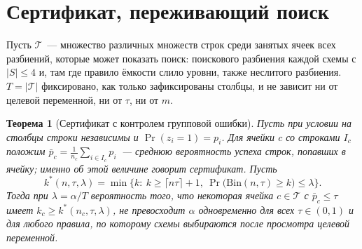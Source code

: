 \documentclass[11pt]{article}
\newtheorem{theorem}{Теорема}
\begin{document}
\section{Сертификат, переживающий поиск}\label{sec:certificate}

Пусть $\mathcal{T}$~--- множество различных множеств строк среди занятых ячеек всех разбиений, которые может показать поиск: поискового разбиения каждой схемы с $|S|\le 4$ и, там где правило ёмкости слило уровни, также неслитого разбиения. $T=|\mathcal{T}|$ фиксировано, как только зафиксированы столбцы, и не зависит ни от целевой переменной, ни от $\tau$, ни от $m$.

\begin{theorem}[Сертификат с контролем групповой ошибки]\label{thm:cert}
Пусть при условии на столбцы строки независимы и $\Pr(z_i=1)=p_i$. Для ячейки $c$ со строками $I_c$ положим $\bar p_c=\frac1{n_c}\sum_{i\in I_c}p_i$~--- среднюю вероятность успеха строк, попавших в ячейку; именно об этой величине говорит сертификат. Пусть
\[
k^*(n,\tau,\lambda)=\min\Big\{k:\ k\ge\lceil n\tau\rceil+1,\ \Pr\big(\mathrm{Bin}(n,\tau)\ge k\big)\le\lambda\Big\}.
\]
Тогда при $\lambda=\alpha/T$ вероятность того, что некоторая ячейка $c\in\mathcal{T}$ с $\bar p_c\le\tau$ имеет $k_c\ge k^*(n_c,\tau,\lambda)$, не превосходит $\alpha$ одновременно для всех $\tau\in(0,1)$ и для любого правила, по которому схемы выбираются после просмотра целевой переменной.
\end{theorem}
\end{document}
